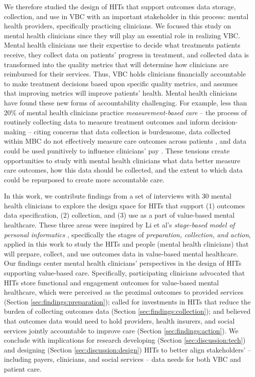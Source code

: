 We therefore studied the design of HITs that support outcomes data storage, collection, and use in VBC with an important stakeholder in this process: mental health providers, specifically practicing clinicians.
We focused this study on mental health clinicians since they will play an essential role in realizing VBC. 
Mental health clinicians use their expertise to decide what treatments patients receive, they collect data on patients' progress in treatment, and collected data is transformed into the quality metrics that will determine how clinicians are reimbursed for their services.
Thus, VBC holds clinicians financially accountable to make treatment decisions based upon specific quality metrics, and assumes that improving metrics will improve patients' health.
Mental health clinicians have found these new forms of accountability challenging.
For example, less than 20\% of mental health clinicians practice \textit{measurement-based care} -- the process of routinely collecting data to measure treatment outcomes and inform decision-making \cite{fortney_tipping_2017, kilbourne_measuring_2018} -- citing concerns that data collection is burdensome, data collected within MBC do not effectively measure care outcomes across patients \cite{tauscher_what_2021, barkham_routine_2023}, and data could be used punitively to influence clinicians' pay \cite{lewis_implementing_2019, desimone_impact_2023}. 
These tensions create opportunities to study with mental health clinicians what data better measure care outcomes, how this data should be collected, and the extent to which data could be repurposed to create more accountable care.

In this work, we contribute findings from a set of interviews with 30  mental health clinicians to explore the design space for HITs that support (1) outcomes data specification, (2) collection, and (3) use as a part of value-based mental healthcare.
These three areas were inspired by Li et al's \textit{stage-based model of personal informatics} \cite{li_stage-based_2010}, specifically the stages of \textit{preparation, collection, and action}, applied in this work to study the HITs and people (mental health clinicians) that will prepare, collect, and use outcomes data in value-based mental healthcare.
Our findings center mental health clinicians' perspectives in the design of HITs supporting value-based care.
Specifically, participating clinicians advocated that HITs store functional and engagement outcomes for value-based mental healthcare, which were perceived as the proximal outcomes to provided services (Section \ref{sec:findings:preparation}); called for investments in HITs that reduce the burden of collecting outcomes data (Section \ref{sec:findings:collection}); and believed that outcomes data would need to hold providers, health insurers, and social services jointly accountable to improve care (Section \ref{sec:findings:action}).
We conclude with implications for research developing (Section \ref{sec:discussion:tech}) and designing (Section \ref{sec:discussion:design}) HITs to better align stakeholders' -- including payers, clinicians, and social services -- data needs for both VBC and patient care.
